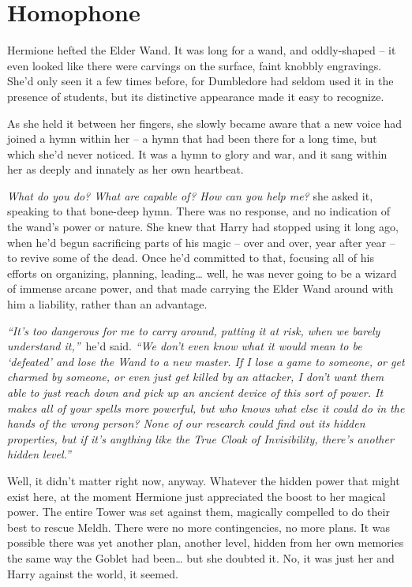\hypertarget{homophone}{%
\chapter{Homophone}\label{homophone}}

Hermione hefted the Elder Wand. It was long for a wand, and oddly-shaped
-- it even looked like there were carvings on the surface, faint knobbly
engravings. She'd only seen it a few times before, for Dumbledore had
seldom used it in the presence of students, but its distinctive
appearance made it easy to recognize.

As she held it between her fingers, she slowly became aware that a new
voice had joined a hymn within her -- a hymn that had been there for a
long time, but which she'd never noticed. It was a hymn to glory and
war, and it sang within her as deeply and innately as her own heartbeat.

\emph{What do you do? What are capable of? How can you help me?} she
asked it, speaking to that bone-deep hymn. There was no response, and no
indication of the wand's power or nature. She knew that Harry had
stopped using it long ago, when he'd begun sacrificing parts of his
magic -- over and over, year after year -- to revive some of the dead.
Once he'd committed to that, focusing all of his efforts on organizing,
planning, leading\ldots{} well, he was never going to be a wizard of
immense arcane power, and that made carrying the Elder Wand around with
him a liability, rather than an advantage.

\emph{``It's too dangerous for me to carry around, putting it at risk,
when we barely understand it,''}~he'd said. \emph{``We don't even know
what it would mean to be `defeated' and lose the Wand to a new master.
If I lose a game to someone, or get charmed by someone, or even just get
killed by an attacker, I don't want them able to just reach down and
pick up an ancient device of this sort of power. It makes all of your
spells more powerful, but who knows what else it could do in the hands
of the wrong person? None of our research could find out its hidden
properties, but if it's anything like the True Cloak of Invisibility,
there's another hidden level.''}

Well, it didn't matter right now, anyway. Whatever the hidden power that
might exist here, at the moment Hermione just appreciated the boost to
her magical power. The entire Tower was set against them, magically
compelled to do their best to rescue Meldh. There were no more
contingencies, no more plans. It was possible there was yet another
plan, another level, hidden from her own memories the same way the
Goblet had been\ldots{} but she doubted it. No, it was just her and
Harry against the world, it seemed.

